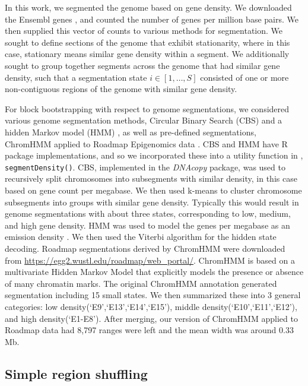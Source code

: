 \documentclass{article}
\begin{document}
In this work, we segmented the genome based on gene density. We
downloaded the Ensembl genes \citep{ensemblTrimmedEntry} , and counted the 
number of genes per million base pairs. We then supplied this vector
of counts to various methods for segmentation. We sought to define
sections of the genome that exhibit stationarity, where in this case,
stationary means similar gene density within a segment. We
additionally sought to group together segments across the genome that
had similar gene density, such that a segmentation state
$i \in [1,\dots,S]$ consisted of one or more non-contiguous regions of
the genome with similar gene density.

For block bootstrapping with respect to genome segmentations,
we considered various genome segmentation methods,
Circular Binary Search (CBS) \citep{cbs} and a hidden Markov model (HMM)
\citep{rcpphmm}, as well as pre-defined segmentations,
ChromHMM applied to 
Roadmap Epigenomics data \citep{ernst2012chromhmm}.
CBS and HMM
have R package implementations, and so we incorporated these
into a utility function in \nullranges, \texttt{segmentDensity()}.
CBS, implemented in the \textit{DNAcopy} package, was used to recursively split
chromosomes into subsegments with similar density, in this case based
on gene count per megabase. We then used k-means to cluster
chromosome subsegments into groups with similar gene
density. Typically this would result in genome segmentations with
about three states, corresponding to low, medium, and high gene
density. 
HMM was used to model the genes per megabase as an emission
density . We then used the
Viterbi algorithm for the hidden state decoding. 
Roadmap segmentations derived by ChromHMM \citep{ernst2012chromhmm} were
downloaded from
\url{https://egg2.wustl.edu/roadmap/web_portal/}. ChromHMM is based on
a multivariate Hidden Markov Model that explicitly models the presence
or absence of many chromatin marks. The original ChromHMM annotation
generated segmentation including 
15 small states. We then summarized these into 3 general categories: low
density(`E9',`E13',`E14',`E15'), middle density(`E10',`E11',`E12'),
and high density(`E1-E8'). 
After merging, our version of ChromHMM applied to Roadmap data had
8,797 ranges were left and the mean width was around 
0.33 Mb.

\subsection{Simple region shuffling}\label{sec:shuffle}
\end{document}
